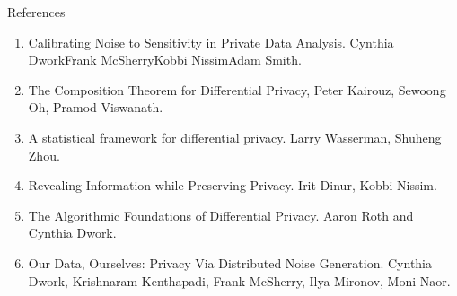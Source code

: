 \documentclass[aspectratio=169]{beamer}
\begin{document}
\begin{frame}{References}
\begin{enumerate}
\item
Calibrating Noise to Sensitivity in Private Data Analysis. Cynthia DworkFrank McSherryKobbi NissimAdam Smith.
\item
The Composition Theorem for Differential Privacy, Peter Kairouz, Sewoong Oh, Pramod Viswanath.
\item
A statistical framework for differential privacy. Larry Wasserman, Shuheng Zhou.
\item
Revealing Information while Preserving Privacy. Irit Dinur,  Kobbi Nissim.
\item
The Algorithmic Foundations of Differential Privacy. Aaron Roth and Cynthia Dwork.
\item
Our Data, Ourselves: Privacy Via Distributed Noise Generation. Cynthia Dwork, Krishnaram Kenthapadi, Frank McSherry, Ilya Mironov, Moni Naor.
\end{enumerate}
\end{frame}
\end{document}
